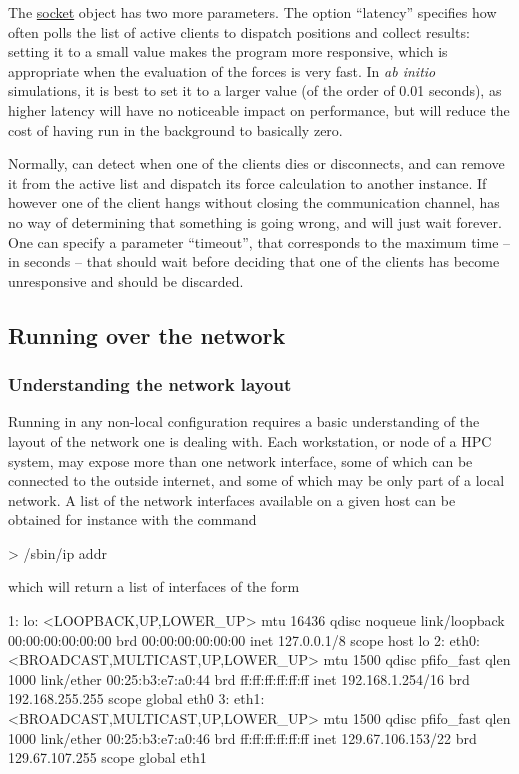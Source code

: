 \documentclass[11pt,english,fleqn]{report}
\newenvironment{code}{%
\footnotesize
\verbatim
}{
\endverbatim
\normalsize
}
\begin{document}
The \hyperref[FFSOCKET]{socket} object has two more parameters.
The option ``latency'' specifies how often \ipi{} polls the list of
active clients to dispatch positions and collect results:
setting it to a small value makes the program more responsive,
which is appropriate when the evaluation of the forces is very
fast. In \emph{ab initio} simulations, it is best to set it to
a larger value (of the order of 0.01 seconds), as higher latency
will have no noticeable impact on performance, but will reduce
the cost of having \ipi run in the background to basically zero.

Normally, \ipi can detect when one of the clients dies or disconnects,
and can remove it from the active list and dispatch its force calculation
to another instance. If however one of the client hangs without
closing the communication channel, \ipi has no way of determining that
something is going wrong, and will just wait forever. One can
specify a parameter ``timeout'', that corresponds to the maximum time -- in
seconds -- that \ipi should wait before deciding that one of the clients
has become unresponsive and should be discarded.

\subsection{Running \ipi over the network}

\subsubsection{Understanding the network layout}

Running \ipi in any non-local configuration requires a basic understanding
of the layout of the network one is dealing with. Each workstation, or node
of a HPC system, may expose more than one network interface, some of which
can be connected to the outside internet, and some of which may be only part
of a local network. A list of the network interfaces available on a given host
can be obtained for instance with the command

\begin{code}
> /sbin/ip addr
\end{code}

\noindent which will return a list of interfaces of the form

\begin{code}
1: lo: <LOOPBACK,UP,LOWER_UP> mtu 16436 qdisc noqueue
    link/loopback 00:00:00:00:00:00 brd 00:00:00:00:00:00
    inet 127.0.0.1/8 scope host lo
2: eth0: <BROADCAST,MULTICAST,UP,LOWER_UP> mtu 1500 qdisc pfifo_fast qlen 1000
    link/ether 00:25:b3:e7:a0:44 brd ff:ff:ff:ff:ff:ff
    inet 192.168.1.254/16 brd 192.168.255.255 scope global eth0
3: eth1: <BROADCAST,MULTICAST,UP,LOWER_UP> mtu 1500 qdisc pfifo_fast qlen 1000
    link/ether 00:25:b3:e7:a0:46 brd ff:ff:ff:ff:ff:ff
    inet 129.67.106.153/22 brd 129.67.107.255 scope global eth1
\end{code}
\end{document}
